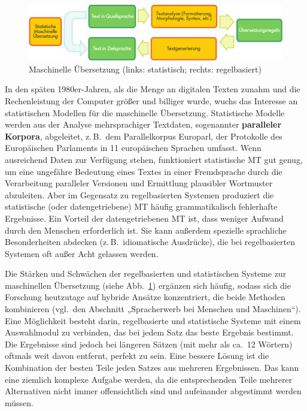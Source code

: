 \begin{multicols}{2}
\begin{figure}[htb]
  \center
  \includegraphics[width=\textwidth]{../_media/german/machine_translation}
  \caption{Maschinelle Übersetzung (links: statistisch; rechts: regelbasiert)}
  \label{fig:mtarch_de}
\end{figure}

In den späten 1980er-Jahren, als 
die Menge an digitalen Texten zunahm und die Rechenleistung der Computer größer und billiger wurde, 
wuchs das Interesse an statistischen Modellen für die maschinelle Übersetzung. Statistische Modelle werden aus der Analyse mehrsprachiger Textdaten, sogenannter \textbf{paralleler Korpora}, abgeleitet, z.\,B.~dem Parallelkorpus Europarl, der Protokolle des Europäischen Parlaments in 11 europäischen Sprachen umfasst. Wenn ausreichend Daten zur Verfügung stehen, funktioniert statistische MT gut genug, um eine ungefähre Bedeutung eines Textes in einer Fremdsprache durch die Verarbeitung paralleler Versionen und Ermittlung plausibler Wortmuster abzuleiten. Aber im Gegensatz zu regelbasierten Systemen produziert die statistische (oder datengetriebene) MT häufig grammatikalisch fehlerhafte Ergebnisse. Ein Vorteil der datengetriebenen MT ist, dass weniger Aufwand durch den Menschen erforderlich ist. Sie kann außerdem spezielle sprachliche Besonderheiten abdecken (z.\,B.~idiomatische Ausdrücke), die bei regelbasierten Systemen oft außer Acht gelassen werden.

Die Stärken und Schwächen der regelbasierten und statistischen Systeme zur maschinellen Übersetzung (siehe Abb.~\ref{fig:mtarch_de}) ergänzen sich häufig, sodass sich die Forschung heutzutage auf hybride Ansätze konzentriert, die beide Methoden kombinieren (vgl.~den Abschnitt „Spracherwerb bei Menschen und Maschinen“). Eine Möglichkeit besteht darin, regelbasierte und statistische Systeme mit einem Auswahlmodul zu verbinden, das bei jedem Satz das beste Ergebnis bestimmt. Die Ergebnisse sind jedoch bei längeren Sätzen (mit mehr als ca.~12 Wörtern) oftmals weit davon entfernt, perfekt zu sein. Eine bessere Lösung ist die Kombination der besten Teile jeden Satzes aus mehreren Ergebnissen. Das kann eine ziemlich komplexe Aufgabe werden, da die entsprechenden Teile mehrerer Alternativen nicht immer offensichtlich sind und aufeinander abgestimmt werden müssen. 


\end{multicols}
